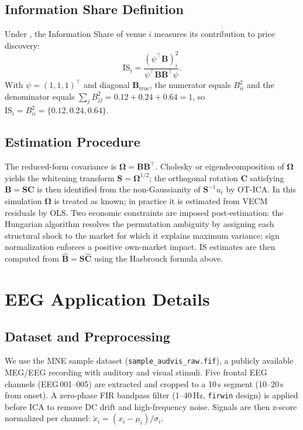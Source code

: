 \documentclass[accepted]{tpm2026} %
\begin{document}
\subsection{Information Share Definition}
Under \citet{hasbrouck1995}, the Information Share of venue $i$ measures its contribution to price discovery:
\begin{equation}
    \mathrm{IS}_i = \frac{(\psi^\top \mathbf{B})_i^2}{\psi^\top \mathbf{B}\mathbf{B}^\top \psi}.
\end{equation}
With $\psi = (1,1,1)^\top$ and diagonal $\mathbf{B}_{\text{true}}$, the numerator equals $B_{ii}^2$ and the denominator equals $\sum_j B_{jj}^2 = 0.12 + 0.24 + 0.64 = 1$, so $\mathrm{IS}_i = B_{ii}^2 = \{0.12, 0.24, 0.64\}$.

\subsection{Estimation Procedure}
The reduced-form covariance is $\boldsymbol{\Omega} = \mathbf{B}\mathbf{B}^\top$. Cholesky or eigendecomposition of $\boldsymbol{\Omega}$ yields the whitening transform $\mathbf{S} = \boldsymbol{\Omega}^{1/2}$; the orthogonal rotation $\mathbf{C}$ satisfying $\mathbf{B} = \mathbf{S}\mathbf{C}$ is then identified from the non-Gaussianity of $\mathbf{S}^{-1}u_t$ by OT-ICA. In this simulation $\boldsymbol{\Omega}$ is treated as known; in practice it is estimated from VECM residuals by OLS. Two economic constraints are imposed post-estimation: the Hungarian algorithm \citep{kuhn1955hungarian} resolves the permutation ambiguity by assigning each structural shock to the market for which it explains maximum variance; sign normalization enforces a positive own-market impact. IS estimates are then computed from $\hat{\mathbf{B}} = \mathbf{S}\hat{\mathbf{C}}$ using the Hasbrouck formula above.

\section{EEG Application Details}
\label{app:eeg}

\subsection{Dataset and Preprocessing}
We use the MNE sample dataset (\texttt{sample\_audvis\_raw.fif}), a publicly available MEG/EEG recording with auditory and visual stimuli.
Five frontal EEG channels (EEG\,001--005) are extracted and cropped to a 10\,s segment (10--20\,s from onset).
A zero-phase FIR bandpass filter (1--40\,Hz, \texttt{firwin} design) is applied before ICA to remove DC drift and high-frequency noise.
Signals are then z-score normalized per channel: $\tilde{x}_i = (x_i - \mu_i)/\sigma_i$.
\end{document}
